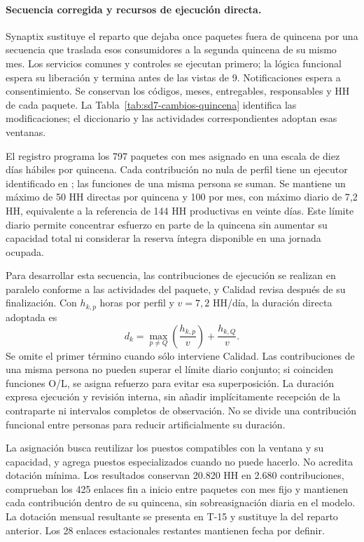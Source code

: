 \paragraph{Secuencia corregida y recursos de ejecución directa.}
Synaptix sustituye el reparto que dejaba once paquetes fuera de quincena por una secuencia que traslada esos consumidores a la segunda quincena de su mismo mes. Los servicios comunes y controles se ejecutan primero; la lógica funcional espera su liberación y termina antes de las vistas de 9. Notificaciones espera a consentimiento. Se conservan los códigos, meses, entregables, responsables y HH de cada paquete. La Tabla~\ref{tab:sd7-cambios-quincena} identifica las modificaciones; el diccionario y las actividades correspondientes adoptan esas ventanas.



El registro  programa los 797 paquetes con mes asignado en una escala de diez días hábiles por quincena. Cada contribución no nula de perfil tiene un ejecutor identificado en ; las funciones de una misma persona se suman. Se mantiene un máximo de 50 HH directas por quincena y 100 por mes, con máximo diario de 7,2 HH, equivalente a la referencia de 144 HH productivas en veinte días. Este límite diario permite concentrar esfuerzo en parte de la quincena sin aumentar su capacidad total ni considerar la reserva íntegra disponible en una jornada ocupada.

Para desarrollar esta secuencia, las contribuciones de ejecución se realizan en paralelo conforme a las actividades del paquete, y Calidad revisa después de su finalización. Con $h_{k,p}$ horas por perfil y $v=7{,}2$ HH/día, la duración directa adoptada es
\[
d_k=\max_{p\ne Q}\left(\frac{h_{k,p}}{v}\right)+\frac{h_{k,Q}}{v}.
\]
Se omite el primer término cuando sólo interviene Calidad. Las contribuciones de una misma persona no pueden superar el límite diario conjunto; si coinciden funciones O/L, se asigna refuerzo para evitar esa superposición. La duración expresa ejecución y revisión interna, sin añadir implícitamente recepción de la contraparte ni intervalos completos de observación. No se divide una contribución funcional entre personas para reducir artificialmente su duración.

La asignación busca reutilizar los puestos compatibles con la ventana y su capacidad, y agrega puestos especializados cuando no puede hacerlo. No acredita dotación mínima. Los resultados conservan 20.820 HH en 2.680 contribuciones, comprueban los 425 enlaces fin a inicio entre paquetes con mes fijo y mantienen cada contribución dentro de su quincena, sin sobreasignación diaria en el modelo. La dotación mensual resultante se presenta en T-15 y sustituye la del reparto anterior. Los 28 enlaces estacionales restantes mantienen fecha por definir.

